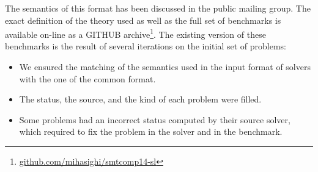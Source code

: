 \documentclass{llncs}
\newcommand{\SLEEK}{\textsc{Sleek}}
\begin{document}
The semantics of this format has been discussed in the public mailing group. 
The exact definition of the theory used as well as the full set of benchmarks is available on-line as a GITHUB archive\footnote{\url{github.com/mihasighi/smtcomp14-sl}}.
The existing version of these benchmarks is the result of several iterations on the initial set of problems:
\begin{itemize}
\item We ensured the matching of the semantics used in the input format of solvers with the one of the common format. 
\item The status, the source, and the kind of each problem were filled.
\item Some problems had an incorrect status computed by their source solver, which required to fix the problem in the solver and in the benchmark.
\end{itemize}
\end{document}
